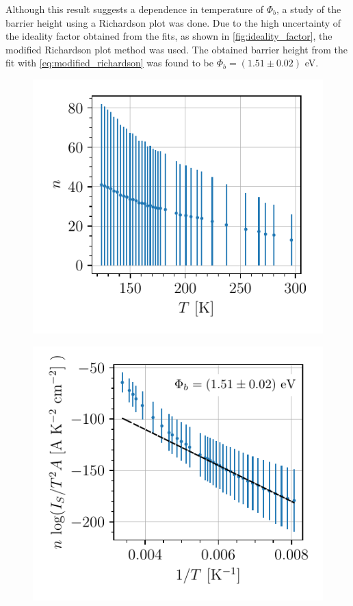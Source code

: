 Although this result suggests a dependence in temperature of $\Phi_b$, a study of the barrier height using a Richardson plot was done. Due to the high uncertainty of the ideality factor obtained from the fits, as shown in \autoref{fig:ideality_factor}, the modified Richardson plot method was used. The obtained barrier height from the fit with \autoref{eq:modified_richardson} was found to be $\Phi_b = (1.51 \pm 0.02)$ eV.
\begin{figure}[htbp]
    \centering
    \begin{minipage}[t]{0.49\textwidth}
        \centering
        \captionsetup{width=.95\linewidth}
        \includegraphics[width=\textwidth]{figures/iv-ideality-factor.pdf}
        \label{fig:ideality_factor}
    \end{minipage}
    \begin{minipage}[t]{0.49\textwidth}
        \centering
        \captionsetup{width=.95\linewidth}
        \includegraphics[width=\textwidth]{figures/richardson.pdf}

\end{minipage}
\end{figure}
